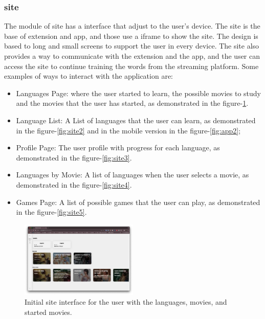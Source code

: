 \documentclass[12pt]{article}
\begin{document}
\subsubsection{site}
The module of site has a interface that adjust to the user's device. The site is the base of extension and app, and those use a iframe to show the site. The design is based to long and small screens to support the user in every device. The site also provides a way to communicate with the extension and the app, and the user can access the site to continue training the words from the streaming platform. Some examples of ways to interact with the application are:
\begin{itemize}
\item   Languages Page: where the user started to learn, the possible movies to study and the movies that the user has started, as demonstrated in the figure-\ref{fig:site1}.
\item Language List: A List of languages that the user can learn, as demonstrated in the figure-\ref{fig:site2} and in the mobile version in the figure-\ref{fig:app2};
\item Profile Page: The user profile with progress for each language, as demonstrated in the figure-\ref{fig:site3}.
\item Languages by Movie: A list of languages when the user selects a movie, as demonstrated in the figure-\ref{fig:site4}.
\item Games Page: A list of possible games that the user can play, as demonstrated in the figure-\ref{fig:site5}.
\end{itemize}
  \begin{figure}[!h]
   \centering
   \caption{
   Initial site interface for the user with the languages, movies, and started movies.
    }
   \label{fig:site1}
   \includegraphics[width=0.5\textwidth]{assets/20.png}
  \end{figure}
\end{document}

